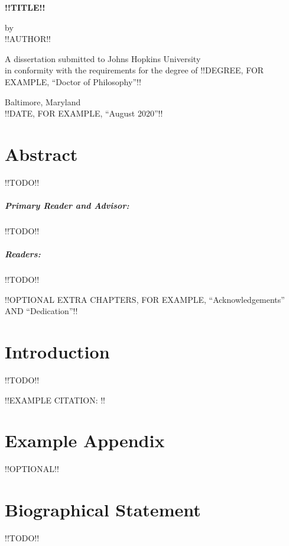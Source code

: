 \documentclass[12pt, oneside]{book}
\begin{document}
\frontmatter

\begin{center}
\begin{singlespace}
\vspace*{0.5in}

\textbf{\uppercase{!!TITLE!!}}

\vspace*{1in}

by\\!!AUTHOR!!

\vspace*{1.5in}

A dissertation submitted to Johns Hopkins University\\in conformity with the requirements for the degree of !!DEGREE, FOR EXAMPLE, “Doctor of Philosophy”!!

\vspace*{0.5in}

Baltimore, Maryland\\!!DATE, FOR EXAMPLE, “August 2020”!!
\end{singlespace}
\end{center}

\thispagestyle{empty}
\clearpage

\chapter{Abstract}

!!TODO!!

\paragraph{Primary Reader and Advisor:}

!!TODO!!

\paragraph{Readers:}

!!TODO!!

!!OPTIONAL EXTRA CHAPTERS, FOR EXAMPLE, “Acknowledgements” AND “Dedication”!!

\tableofcontents
\listoftables
\listoffigures

\mainmatter

\chapter{Introduction}

!!TODO!!

!!EXAMPLE CITATION: \cite{template}!!

\appendix

\chapter{Example Appendix}

!!OPTIONAL!!

\backmatter




\chapter{Biographical Statement}

!!TODO!!
\end{document}
